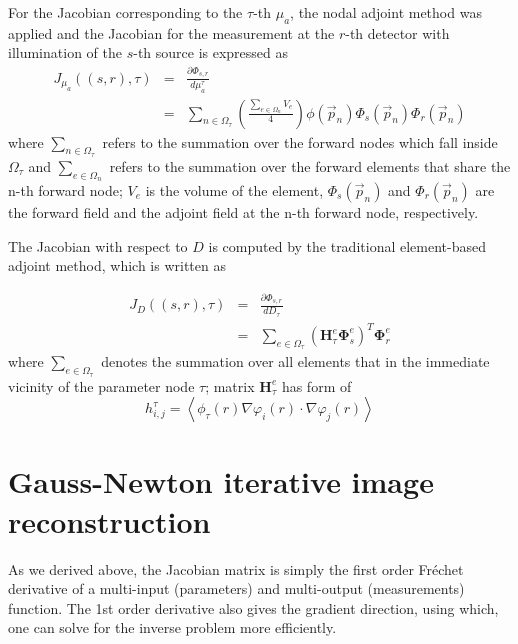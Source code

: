 \documentclass{article}
\begin{document}
For the Jacobian corresponding to the $\tau$-th $\mu_a$, the nodal
adjoint method was applied and the Jacobian for the measurement at
the $r$-th detector with illumination of the $s$-th source is
expressed as
\begin{eqnarray}\nonumber
J_{\mu_a}((s,r),\tau)&=&\frac{\partial
\Phi_{s,r}}{d\mu_a^{\tau}}\\&=&\sum_{n\in\Omega_\tau}\left(\frac{\sum_{e\in\Omega_n}
V_e}{4}\right)\phi(\vec{p}_n)\Phi_s(\vec{p}_n)\Phi_r(\vec{p}_n)
\end{eqnarray}
where $\sum_{n\in\Omega_\tau}$ refers to the summation over the
forward nodes which fall inside $\Omega_\tau$ and
$\sum_{e\in\Omega_n}$ refers to the summation over the forward
elements that share the n-th forward node; $V_e$ is the volume of
the element, $\Phi_s(\vec{p}_n)$ and $\Phi_r(\vec{p}_n)$ are the
forward field and the adjoint field at the n-th forward node,
respectively.

The Jacobian with respect to $D$ is computed by the traditional
element-based adjoint method, which is written as

\begin{eqnarray}\nonumber
J_{D}((s,r),\tau)&=&\frac{\partial
\Phi_{s,r}}{dD_{\tau}}\\&=&\sum_{e\in\Omega_\tau}\left(\mathbf{H}_\tau^e{\boldsymbol\Phi}_s^e\right)^T{\boldsymbol\Phi}_r^e
\end{eqnarray}
where $\sum_{e\in\Omega_\tau}$ denotes the summation over all
elements that in the immediate vicinity of the parameter node $\tau$;
matrix $\mathbf{H}_\tau^e$ has form of
\begin{equation}
h^\tau_{i,j}=\left\langle
\phi_\tau(r)\nabla\varphi_i(r)\cdot\nabla\varphi_j(r)\right\rangle
\end{equation}

\section{Gauss-Newton iterative image reconstruction}
As we derived above, the Jacobian matrix is simply the first order Fr\'echet derivative of a multi-input (parameters) and multi-output (measurements) function. The 1st order derivative also gives the gradient direction, using which, one can solve for the inverse problem more efficiently.
\end{document}
